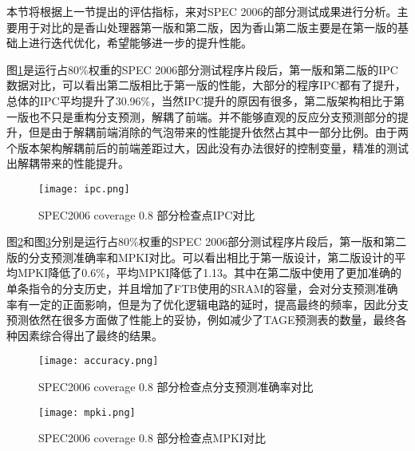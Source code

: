 本节将根据上一节提出的评估指标，来对SPEC 2006的部分测试成果进行分析。主要用于对比的是香山处理器第一版和第二版，因为香山第二版主要是在第一版的基础上进行迭代优化，希望能够进一步的提升性能。

图\ref{fig:figure61}是运行占80\%权重的SPEC 2006部分测试程序片段后，第一版和第二版的IPC数据对比，可以看出第二版相比于第一版的性能，大部分的程序IPC都有了提升，总体的IPC平均提升了30.96\%，当然IPC提升的原因有很多，第二版架构相比于第一版也不只是重构分支预测，解耦了前端。并不能够直观的反应分支预测部分的提升，但是由于解耦前端消除的气泡带来的性能提升依然占其中一部分比例。由于两个版本架构解耦前后的前端差距过大，因此没有办法很好的控制变量，精准的测试出解耦带来的性能提升。


\begin{figure}[htb]
	\centering
	\setlength\tabcolsep{3pt}  %
	\vspace{5pt} %
	\texttt{[image: ipc.png]}
	\caption{SPEC2006 coverage 0.8 部分检查点IPC对比}
	\label{fig:figure61}
\end{figure}

图\ref{fig:figure64}和图\ref{fig:figure62}分别是运行占80\%权重的SPEC 2006部分测试程序片段后，第一版和第二版的分支预测准确率和MPKI对比。可以看出相比于第一版设计，第二版设计的平均MPKI降低了0.6\%，平均MPKI降低了1.13。其中在第二版中使用了更加准确的单条指令的分支历史，并且增加了FTB使用的SRAM的容量，会对分支预测准确率有一定的正面影响，但是为了优化逻辑电路的延时，提高最终的频率，因此分支预测依然在很多方面做了性能上的妥协，例如减少了TAGE预测表的数量，最终各种因素综合得出了最终的结果。

\begin{figure}[htb]
	\centering
	\setlength\tabcolsep{3pt}  %
	\vspace{5pt} %
	\texttt{[image: accuracy.png]}
	\caption{SPEC2006 coverage 0.8 部分检查点分支预测准确率对比}
	\label{fig:figure64}
\end{figure}



\begin{figure}[htb]
	\centering
	\setlength\tabcolsep{3pt}  %
	\vspace{5pt} %
	\texttt{[image: mpki.png]}
	\caption{SPEC2006 coverage 0.8 部分检查点MPKI对比}
	\label{fig:figure62}
\end{figure}

